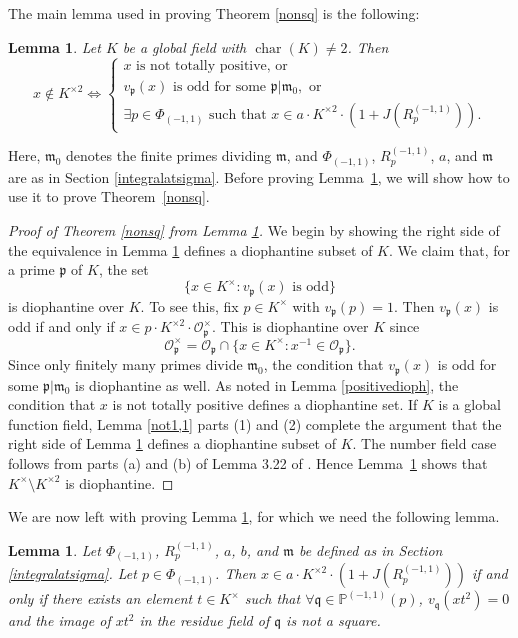 \documentclass[12pt,reqno]{amsart}
\newcommand{\qq}{\mathfrak{q}}
\newcommand{\mm}{\mathfrak{m}}
\newcommand{\OO}{\mathcal{O}}
\newcommand{\pp}{\mathfrak{p}}
\newcommand{\PP}{\mathbb{P}}
\DeclareMathOperator{\ch}{char}
\newtheorem{lem}[thm]{Lemma}
\theoremstyle{definition}
\begin{document}
The main lemma used in proving Theorem \ref{nonsq} is the following:
\begin{lem}\label{noreal}
Let $K$ be a global field with $\ch(K)\not=2$. Then
\[
x\not\in K^{\times2} \iff \begin{cases} x \text { is not totally
    positive, or } \\ v_{\pp}(x) \text{ is odd for some } \pp|\mm_0, \text{ or } \\ \exists p\in \Phi_{(-1,1)} \text{ such that } x\in a\cdot K^{\times2}\cdot(1+J(R_p^{(-1,1)})). \end{cases}
\]
\end{lem}
Here, $\mm_0$ denotes the finite primes dividing $\mm$, and $\Phi_{(-1,1)}$, $R_p^{(-1,1)}$, $a$, and $\mm$ are as in
Section
 \ref{integralatsigma}.
Before proving Lemma~\ref{noreal}, we will show how to use it to prove Theorem~\ref{nonsq}.








\begin{proof}[Proof of Theorem \ref{nonsq} from Lemma \ref{noreal}]
We begin by showing the right side of the equivalence in Lemma
\ref{noreal} defines a diophantine subset of $K$. We claim that, for a prime $\pp$ of $K$, the set
\[
\{x\in K^{\times}: v_{\pp}(x) \text{ is odd}\} 
\]
is diophantine over $K$. To see this, fix $p\in K^{\times}$ with
$v_{\pp}(p)=1$. Then $v_{\pp}(x)$ is odd if and only if 
$x\in p\cdot K^{\times2}\cdot \OO_{\pp}^{\times}$. This is diophantine over $K$ since
\[
\OO^{\times}_{\pp}=\OO_{\pp}\cap\{x\in K^{\times}: x^{-1}\in \OO_{\pp}\}.
\]
Since only finitely many primes divide $\mm_0$, the condition that 
$v_{\pp}(x)$ is odd for some $\pp|\mm_0$ is diophantine as well. As
noted in Lemma \ref{positivedioph}, the condition that $x$ is not
 totally positive defines a diophantine set. If $K$ is a global
 function field, Lemma \ref{not1,1} parts (1) and (2) complete the
 argument that the right side of Lemma \ref{noreal} defines a
 diophantine subset of $K$. The number field case follows from parts
 (a) and (b) of Lemma 3.22 of \cite{Park}. Hence Lemma~\ref{noreal} 
shows that $K^{\times}\setminus K^{\times2}$ is diophantine.
\end{proof}


We are now left with proving Lemma \ref{noreal}, for which we need the following lemma.


\begin{lem}\label{nslem1}
Let $\Phi_{(-1,1)}$, $R_p^{(-1,1)}$, $a$, $b$, and $\mm$ be defined as in Section \ref{integralatsigma}. Let $p\in \Phi_{(-1,1)}$. Then
 $x\in a\cdot K^{\times2}\cdot(1+J(R_p^{(-1,1)}))$ if and only if there exists an element $t\in K^{\times}$ such that $\forall \qq\in \PP^{(-1,1)}(p)$, $v_{\qq}(xt^2)=0$ and the image of $xt^2$ in the residue field of $\qq$ is not a square. 
\end{lem}
\end{document}
